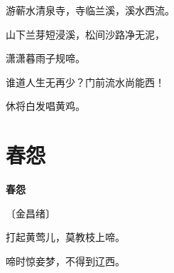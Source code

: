 \documentclass[12pt,UTF-8,openany,fontset=none]{ctexbook}
\begin{document}
    \vspace{12pt}\mbox{}

    \begin{large}\xuwen
        游蕲水清泉寺，寺临兰溪，溪水西流。
    \end{large}


    \vspace{8pt}

\begin{center}
    \begin{Large}

        山下兰芽短浸溪，松间沙路净无泥，

        潇潇暮雨子规啼。

        \vspace{18pt}  %

        谁道人生无再少？门前流水尚能西！

        休将白发唱黄鸡。

    \end{Large}

\end{center}

\vspace{8pt}
\clearpage

\section{春怨}


\begin{center}
    {\bfseries 春怨}

    \vspace{18pt}

    \begin{large}\xuwen
        〔金昌绪〕
    \end{large}

\end{center}

    \vspace{18pt}

\begin{center}
    \begin{Large}

        打起黄莺儿，莫教枝上啼。

        啼时惊妾梦，不得到辽西。

    \end{Large}

\end{center}
\end{document}
